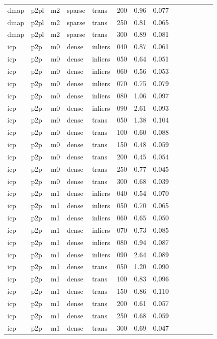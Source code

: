\begin{table}[htbp]
\begin{tabular}{llllllrrrrrrrr}
  dmap & p2pl & m2 & sparse & trans & 200 & 0.96 & 0.077 \\
  dmap & p2pl & m2 & sparse & trans & 250 & 0.81 & 0.065 \\
  dmap & p2pl & m2 & sparse & trans & 300 & 0.89 & 0.081 \\
  icp & p2p & m0 & dense & inliers & 040 & 0.87 & 0.061 \\
  icp & p2p & m0 & dense & inliers & 050 & 0.64 & 0.051 \\
  icp & p2p & m0 & dense & inliers & 060 & 0.56 & 0.053 \\
  icp & p2p & m0 & dense & inliers & 070 & 0.75 & 0.079 \\
  icp & p2p & m0 & dense & inliers & 080 & 1.06 & 0.097 \\
  icp & p2p & m0 & dense & inliers & 090 & 2.61 & 0.093 \\
  icp & p2p & m0 & dense & trans & 050 & 1.38 & 0.104 \\
  icp & p2p & m0 & dense & trans & 100 & 0.60 & 0.088 \\
  icp & p2p & m0 & dense & trans & 150 & 0.48 & 0.059 \\
  icp & p2p & m0 & dense & trans & 200 & 0.45 & 0.054 \\
  icp & p2p & m0 & dense & trans & 250 & 0.77 & 0.045 \\
  icp & p2p & m0 & dense & trans & 300 & 0.68 & 0.039 \\
  icp & p2p & m1 & dense & inliers & 040 & 0.54 & 0.070 \\
  icp & p2p & m1 & dense & inliers & 050 & 0.70 & 0.065 \\
  icp & p2p & m1 & dense & inliers & 060 & 0.65 & 0.050 \\
  icp & p2p & m1 & dense & inliers & 070 & 0.73 & 0.085 \\
  icp & p2p & m1 & dense & inliers & 080 & 0.94 & 0.087 \\
  icp & p2p & m1 & dense & inliers & 090 & 2.64 & 0.089 \\
  icp & p2p & m1 & dense & trans & 050 & 1.20 & 0.090 \\
  icp & p2p & m1 & dense & trans & 100 & 0.83 & 0.096 \\
  icp & p2p & m1 & dense & trans & 150 & 0.86 & 0.110 \\
  icp & p2p & m1 & dense & trans & 200 & 0.61 & 0.057 \\
  icp & p2p & m1 & dense & trans & 250 & 0.68 & 0.059 \\
  icp & p2p & m1 & dense & trans & 300 & 0.69 & 0.047 \\

\end{tabular}
\end{table}
